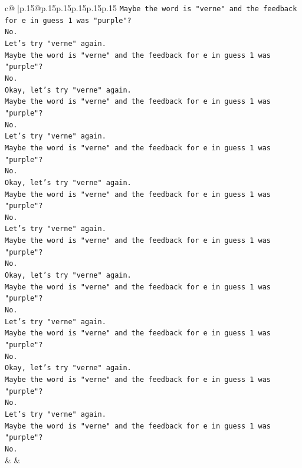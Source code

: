 \documentclass{article}
\begin{document}
{\begin{supertabular}{c@{$\;$}|p{.15\linewidth}@{}p{.15\linewidth}p{.15\linewidth}p{.15\linewidth}p{.15\linewidth}p{.15\linewidth}}
{{{\texttt{Maybe the word is "verne" and the feedback for e in guess 1 was "purple"?} \\
\texttt{No.} \\
\texttt{Let's try "verne" again.} \\
\texttt{Maybe the word is "verne" and the feedback for e in guess 1 was "purple"?} \\
\texttt{No.} \\
\texttt{Okay, let's try "verne" again.} \\
\texttt{Maybe the word is "verne" and the feedback for e in guess 1 was "purple"?} \\
\texttt{No.} \\
\texttt{Let's try "verne" again.} \\
\texttt{Maybe the word is "verne" and the feedback for e in guess 1 was "purple"?} \\
\texttt{No.} \\
\texttt{Okay, let's try "verne" again.} \\
\texttt{Maybe the word is "verne" and the feedback for e in guess 1 was "purple"?} \\
\texttt{No.} \\
\texttt{Let's try "verne" again.} \\
\texttt{Maybe the word is "verne" and the feedback for e in guess 1 was "purple"?} \\
\texttt{No.} \\
\texttt{Okay, let's try "verne" again.} \\
\texttt{Maybe the word is "verne" and the feedback for e in guess 1 was "purple"?} \\
\texttt{No.} \\
\texttt{Let's try "verne" again.} \\
\texttt{Maybe the word is "verne" and the feedback for e in guess 1 was "purple"?} \\
\texttt{No.} \\
\texttt{Okay, let's try "verne" again.} \\
\texttt{Maybe the word is "verne" and the feedback for e in guess 1 was "purple"?} \\
\texttt{No.} \\
\texttt{Let's try "verne" again.} \\
\texttt{Maybe the word is "verne" and the feedback for e in guess 1 was "purple"?} \\
\texttt{No.} \\
            }
        }
    }
    & & \\ \\


\end{supertabular}}
\end{document}
